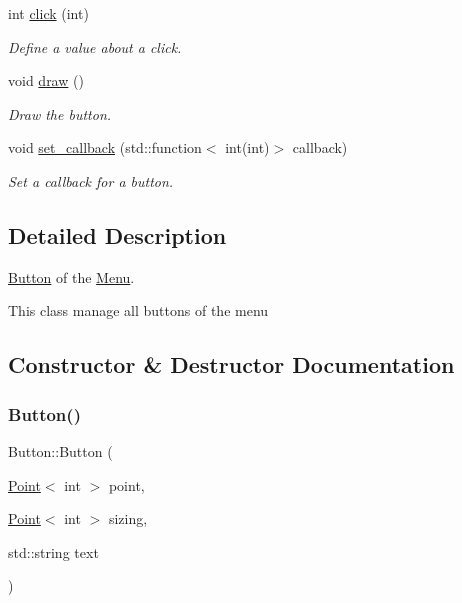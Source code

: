 \begin{DoxyCompactItemize}
int \hyperlink{classButton_af6a02022f77e1809a90cb6159c1a1536}{click} (int)
\begin{DoxyCompactList}\small\item\em Define a value about a click. \end{DoxyCompactList}\item 
\mbox{\label{classButton_a0380207dc9e4edcd0272207a39c7cdeb}} 
void \hyperlink{classButton_a0380207dc9e4edcd0272207a39c7cdeb}{draw} ()
\begin{DoxyCompactList}\small\item\em Draw the button. \end{DoxyCompactList}\item 
void \hyperlink{classButton_aff79964a98ce6c76d0ece8502a830985}{set\+\_\+callback} (std\+::function$<$ int(int)$>$ callback)
\begin{DoxyCompactList}\small\item\em Set a callback for a button. \end{DoxyCompactList}\end{DoxyCompactItemize}


\subsection{Detailed Description}
\hyperlink{classButton}{Button} of the \hyperlink{classMenu}{Menu}. 

This class manage all buttons of the menu 

\subsection{Constructor \& Destructor Documentation}
\mbox{\label{classButton_ab418fa07a8ea3f68f8e97e7d1021e0b6}} 
\subsubsection{\texorpdfstring{Button()}{Button()}\hspace{0.1cm}{\footnotesize\ttfamily [1/2]}}
{\footnotesize\ttfamily Button\+::\+Button (\begin{DoxyParamCaption}\item[{\hyperlink{classPoint}{Point}$<$ int $>$}]{point,  }\item[{\hyperlink{classPoint}{Point}$<$ int $>$}]{sizing,  }\item[{std\+::string}]{text }\end{DoxyParamCaption})}



